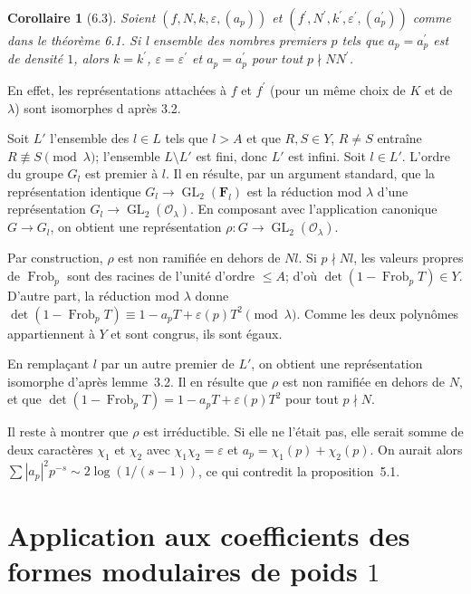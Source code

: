 \documentclass[11pt]{amsart}
\theoremstyle{plain}
\newtheorem{corollaire}[theoreme]{Corollaire}
\theoremstyle{definition}
\theoremstyle{remark}
\DeclareMathOperator{\GL}{GL}
\DeclareMathOperator{\frob}{Frob}
\newcommand{\F}{\mathbf{F}}
\begin{document}
\begin{corollaire}[6.3]
Soient $(f, N, k, \varepsilon, (a_p))$ et $(f^\prime, N^\prime, k^\prime, \varepsilon^\prime, (a_p^\prime))$ comme dans le th\'eor\`eme 6.1. Si l ensemble des nombres premiers $p$ tels que $a_p = a_p^\prime$ est de densit\'e $1$, alors $k = k^\prime$, $\varepsilon = \varepsilon^\prime$ et $a_p = a_p^\prime$ pour tout $p \nmid NN^\prime$.
\end{corollaire}

En effet, les repr\'esentations attach\'ees \`a $f$ et $f^\prime$ (pour un m\^eme choix de $K$ et de $\lambda$) sont isomorphes d apr\`es 3.2.

Soit $L'$ l'ensemble des $l \in L$ tels que $l > A$ et que $R, S \in Y$, $R \neq S$ entra\^ine $R \not\equiv S \pmod{\lambda}$; l'ensemble $L \setminus L'$ est fini, donc $L'$ est infini. Soit $l \in L'$. L'ordre du groupe $G_l$ est premier \`a $l$. Il en r\'esulte, par un argument standard, que la repr\'esentation identique $G_l \to \GL_2(\F_l)$ est la r\'eduction mod $\lambda$ d'une repr\'esentation $G_l \to \GL_2(\mathcal{O}_\lambda)$. En composant avec l'application canonique $G \to G_l$, on obtient une repr\'esentation $\rho : G \to \GL_2(\mathcal{O}_\lambda)$.

Par construction, $\rho$ est non ramifi\'ee en dehors de $Nl$. Si $p \nmid Nl$, les valeurs propres de $\frob_p$ sont des racines de l'unit\'e d'ordre $\leq A$; d'o\`u $\det(1-\frob_p T) \in Y$. D'autre part, la r\'eduction mod $\lambda$ donne $\det(1-\frob_p T) \equiv 1 - a_p T + \varepsilon(p) T^2 \pmod{\lambda}$. Comme les deux polyn\^omes appartiennent \`a $Y$ et sont congrus, ils sont \'egaux.

En rempla\c{c}ant $l$ par un autre premier de $L'$, on obtient une repr\'esentation isomorphe d'apr\`es lemme~3.2. Il en r\'esulte que $\rho$ est non ramifi\'ee en dehors de $N$, et que $\det(1-\frob_p T) = 1 - a_p T + \varepsilon(p) T^2$ pour tout $p \nmid N$.

Il reste \`a montrer que $\rho$ est irr\'eductible. Si elle ne l'\'etait pas, elle serait somme de deux caract\`eres $\chi_1$ et $\chi_2$ avec $\chi_1\chi_2 = \varepsilon$ et $a_p = \chi_1(p) + \chi_2(p)$. On aurait alors $\sum |a_p|^2 p^{-s} \sim 2\log(1/(s-1))$, ce qui contredit la proposition~5.1.

\section{Application aux coefficients des formes modulaires de poids $1$}
\end{document}
